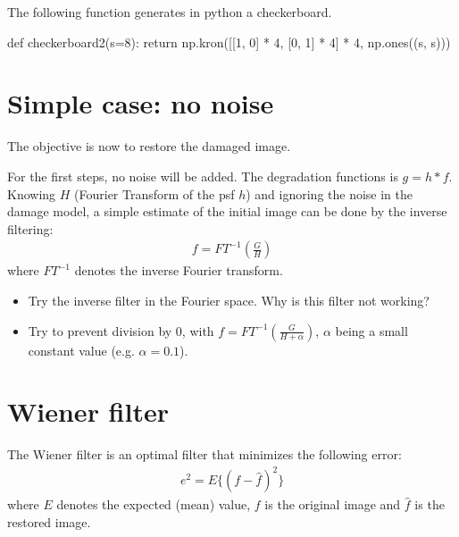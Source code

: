 \begin{pcomment}
 
 \begin{premark}The following function generates in python a checkerboard.
  \begin{python}
def checkerboard2(s=8):
    return np.kron([[1, 0] * 4, [0, 1] * 4] * 4, np.ones((s, s)))
  \end{python}

 \end{premark}

\end{pcomment}


\section{Simple case: no noise}
The objective is now to restore the damaged image.

For the first steps, no noise will be added. The degradation functions is $g=h*f$. Knowing $H$ (Fourier Transform of the psf $h$) and ignoring the noise in the damage model, a simple estimate of the initial image can be done by the inverse filtering:
\begin{eqnarray}
f=FT^{-1}\left(\frac{G}{H}\right)
\end{eqnarray}
where $FT^{-1}$ denotes the inverse Fourier transform.

\begin{qbox}
 \begin{itemize}
  \item Try the inverse filter in the Fourier space. Why is this filter not working?
  \item Try to prevent division by 0, with $f=FT^{-1}\left(\frac{G}{H+\alpha}\right)$, $\alpha$ being a small constant value (e.g. $\alpha=0.1$).
 \end{itemize}
\end{qbox}

\section{Wiener filter}
The Wiener filter is an optimal filter that minimizes the following error:
\begin{eqnarray*}
e^2=E\{(f-\hat{f})^2\}
\end{eqnarray*}
where $E$ denotes the expected (mean) value, $f$ is the original image and $\hat{f}$ is the restored image.

